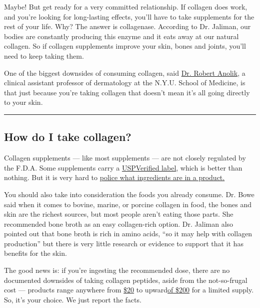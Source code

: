 Maybe! But get ready for a very committed relationship. If collagen does
work, and you're looking for long-lasting effects, you'll have to take
supplements for the rest of your life. Why? The answer is collagenase.
According to Dr. Jaliman, our bodies are constantly producing this
enzyme and it eats away at our natural collagen. So if collagen
supplements improve your skin, bones and joints, you'll need to keep
taking them.

One of the biggest downsides of consuming collagen, said
\href{https://www.charlottesbook.com/bookentries/robert-anolik-md/}{Dr.
Robert Anolik}, a clinical assistant professor of dermatology at the
N.Y.U. School of Medicine, is that just because you're taking collagen
that doesn't mean it's all going directly to your skin.

\begin{center}\rule{0.5\linewidth}{\linethickness}\end{center}

\hypertarget{how-do-i-take-collagen}{%
\subsection{How do I take collagen?}\label{how-do-i-take-collagen}}

Collagen supplements --- like most supplements --- are not closely
regulated by the F.D.A. Some supplements carry a
\href{https://well.blogs.nytimes3xbfgragh.onion/2015/02/12/107141/}{USP}\href{https://well.blogs.nytimes3xbfgragh.onion/2015/02/12/107141/}{Verified
label}, which is better than nothing. But it is very hard to
\href{https://www.consumerreports.org/supplements/how-to-choose-supplements-wisely/}{police
what ingredients are in a product.}

You should also take into consideration the foods you already consume.
Dr. Bowe said when it comes to bovine, marine, or porcine collagen in
food, the bones and skin are the richest sources, but most people aren't
eating those parts. She recommended bone broth as an easy collagen-rich
option. Dr. Jaliman also pointed out that bone broth is rich in amino
acids, ``so it may help with collagen production'' but there is very
little research or evidence to support that it has benefits for the
skin.

The good news is: if you're ingesting the recommended dose, there are no
documented downsides of taking collagen peptides, aside from the
not-so-frugal cost --- products range anywhere from
\href{https://www.sephora.com/product/collagen-peptides-P433638?gclsrc=aw.ds\&gclid=EAIaIQobChMI15qh8rqu3gIVkI7ICh1ibg3JEAYYAiABEgK_OvD_BwE\&skuId=2131589}{\$20}
to
upward\href{https://store.draxe.com/products/bone-broth-collagen-vanilla?variant=23863390341\&gclid=EAIaIQobChMIqPeMpqGu3gIVUVmGCh0jKw-kEAQYBCABEgLb8vD_BwE}{of
\$200} for a limited supply. So, it's your choice. We just report the
facts.

